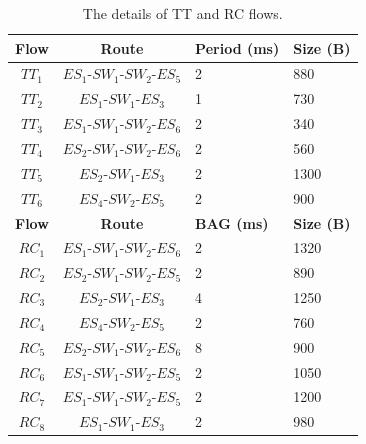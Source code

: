 \documentclass[electronics,article,accept,moreauthors,pdftex]{Definitions/mdpi}
\begin{document}
 \begin{table}[H]
            \centering
            \caption{The details of TT and RC flows.}\label{tab1}
            \begin{tabular}{ccm{1.7cm}<{\centering}m{1.3cm}<{\centering}}
\toprule
{\bf  Flow} & {\bf  Route} & {\bf   Period (ms)} & {\bf  Size (B)}\\
\midrule
$TT_1$ & $ES_1$-$SW_1$-$SW_2$-$ES_5$ & 2 & 880\\

$TT_2$ & $ES_1$-$SW_1$-$ES_3$ & 1 & 730\\

$TT_3$ & $ES_1$-$SW_1$-$SW_2$-$ES_6$ & 2 & 340\\

$TT_4$ & $ES_2$-$SW_1$-$SW_2$-$ES_6$ & 2 & 560 \\

$TT_5$ & $ES_2$-$SW_1$-$ES_3$ & 2 & 1300 \\

$TT_6$ & $ES_4$-$SW_2$-$ES_5$ & 2 & 900\\
\midrule
{\bf  Flow} & {\bf  Route} & {\bf  BAG (ms)} & {\bf  Size (B)}\\
\midrule
$RC_1$ & $ES_1$-$SW_1$-$SW_2$-$ES_6$ & 2 & 1320 \\

$RC_2$ & $ES_2$-$SW_1$-$SW_2$-$ES_5$ & 2 & 890\\

$RC_3$ & $ES_2$-$SW_1$-$ES_3$ & 4 & 1250\\

$RC_4$ & $ES_4$-$SW_2$-$ES_5$ & 2 & 760\\

$RC_5$ & $ ES_2$-$SW_1$-$SW_2$-$ES_6$ & 8 & 900\\

$RC_6$ & $ES_1$-$SW_1$-$SW_2$-$ES_5$ & 2 & 1050\\

$RC_7$ & $ES_1$-$SW_1$-$SW_2$-$ES_5$ & 2 & 1200\\

$RC_8$ & $ES_1$-$SW_1$-$ES_3$ & 2 & 980\\
\bottomrule
\end{tabular}
 \end{table}
\unskip
\end{document}
